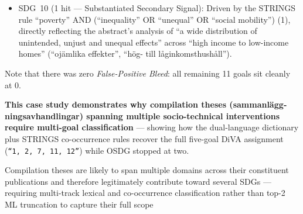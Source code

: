 \begin{casestudySection}
\begin{itemize}
    \item \gls{SDG}~10 (\num{1} hit --- Substantiated Secondary Signal): Driven by the STRINGS rule \enquote{poverty} AND (\enquote{inequality} OR \enquote{unequal} OR \enquote{social mobility}) (1), directly reflecting the abstract's analysis of \enquote{a wide distribution of unintended, unjust and unequal effects} across \enquote{high income to low-income homes} (\enquote{\foreignlanguage{swedish}{ojämlika effekter}}, \enquote{\foreignlanguage{swedish}{hög- till låginkomsthushåll}}).
\end{itemize}

Note that there was zero \textit{False-Positive Bleed}: all remaining \num{11} goals sit cleanly at \num{0}.

\textbf{This case study demonstrates why compilation theses (\foreignlanguage{swedish}{sammanläggningsavhandlingar}) spanning multiple socio-technical interventions require multi-goal classification} --- showing how the dual-language dictionary plus STRINGS co-occurrence rules recover the full five-goal \gls{DiVA} assignment (\texttt{\enquote{1, 2, 7, 11, 12}}) while OSDG stopped at two.
\end{casestudySection}

\begin{takeaway}
Compilation theses are likely to span multiple domains across their constituent publications and
therefore legitimately contribute toward several \glspl{SDG} --- requiring multi-track lexical and co-occurrence classification rather than top-2 \gls{ML} truncation to capture their full scope
\end{takeaway}

